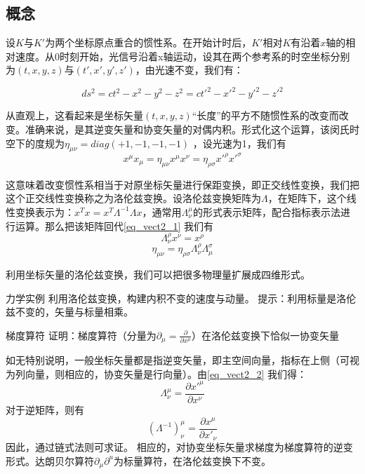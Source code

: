 \subsection{概念}
设$K$与$K'$为两个坐标原点重合的惯性系。在开始计时后，$K'$相对$K$有沿着$x$轴的相对速度。从$0$时刻开始，光信号沿着x轴运动，设其在两个参考系的时空坐标分别为$(t,x,y,z)$与$(t',x',y',z')$，由光速不变，我们有：

$$ds^2=ct^2-x^2-y^2-z^2=ct'^2-x'^2-y'^2-z'^2$$

从直观上，这看起来是坐标矢量$(t,x,y,z)$“长度”的平方不随惯性系的改变而改变。准确来说，是其逆变矢量和协变矢量的对偶内积。形式化这个运算，该闵氏时空下的度规为$\eta_{\mu\nu}=diag(+1,-1,-1,-1) $ ，设光速为1，我们有
\begin{equation}\label{eq_vect2_1}
x^\mu x_\mu =\eta_{\mu\nu}x^\mu x^\nu=\eta_{\rho \sigma}x'^\rho x'^\sigma   
\end{equation}

这意味着改变惯性系相当于对原坐标矢量进行保距变换，即正交线性变换，我们把这个正交线性变换称之为洛伦兹变换。设洛伦兹变换矩阵为$\Lambda$，在矩阵下，这个线性变换表示为：$x^T x=x^T\Lambda^{-1}\Lambda x$，通常用$\Lambda^\mu_\nu $的形式表示矩阵，配合指标表示法进行运算。那么把该矩阵回代\autoref{eq_vect2_1} 我们有
\begin{equation}\label{eq_vect2_2}
\Lambda^\rho_\nu x^\nu=x^\rho
\end{equation}
\begin{equation}
\eta_{\mu\nu}=\eta_{\rho \sigma}\Lambda^\rho_\nu \Lambda^\sigma_\mu 
\end{equation}

利用坐标矢量的洛伦兹变换，我们可以把很多物理量扩展成四维形式。
\begin{exercise}{力学实例}
利用洛伦兹变换，构建内积不变的速度与动量。
提示：利用标量是洛伦兹不变的，矢量与标量相乘。
\end{exercise}
\begin{exercise}{梯度算符}
证明：梯度算符（分量为$\partial_\mu=\frac{\partial}{\partial x^\mu}$）在洛伦兹变换下恰似一协变矢量

如无特别说明，一般坐标矢量都是指逆变矢量，即主空间向量，指标在上侧（可视为列向量，则相应的，协变矢量是行向量）。由\autoref{eq_vect2_2} 我们得：
\begin{equation}
\Lambda^\mu_\nu=\frac{\partial x'^\mu}{\partial x^\nu}
\end{equation}
对于逆矩阵，则有
\begin{equation}
(\Lambda^{-1})^\mu_\nu=\frac{\partial x^\mu }{\partial x'_\nu}
\end{equation}
因此，通过链式法则可求证。
相应的，对协变坐标矢量求梯度为梯度算符的逆变形式。达朗贝尔算符$\partial_\mu\partial^u$为标量算符，在洛伦兹变换下不变。
\end{exercise}
